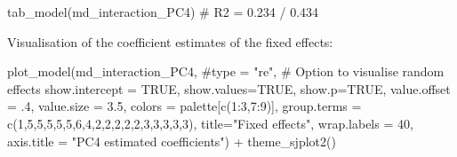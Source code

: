\documentclass[
  letterpaper,
  DIV=11,
  numbers=noendperiod]{scrreprt}
\newenvironment{Shaded}{\begin{snugshade}}{\end{snugshade}}
\newcommand{\AttributeTok}[1]{\textcolor[rgb]{0.40,0.45,0.13}{#1}}
\newcommand{\CommentTok}[1]{\textcolor[rgb]{0.37,0.37,0.37}{#1}}
\newcommand{\ConstantTok}[1]{\textcolor[rgb]{0.56,0.35,0.01}{#1}}
\newcommand{\DecValTok}[1]{\textcolor[rgb]{0.68,0.00,0.00}{#1}}
\newcommand{\FloatTok}[1]{\textcolor[rgb]{0.68,0.00,0.00}{#1}}
\newcommand{\FunctionTok}[1]{\textcolor[rgb]{0.28,0.35,0.67}{#1}}
\newcommand{\NormalTok}[1]{\textcolor[rgb]{0.00,0.23,0.31}{#1}}
\newcommand{\SpecialCharTok}[1]{\textcolor[rgb]{0.37,0.37,0.37}{#1}}
\newcommand{\StringTok}[1]{\textcolor[rgb]{0.13,0.47,0.30}{#1}}
\begin{document}
\begin{Shaded}
\begin{Highlighting}[]
\FunctionTok{tab\_model}\NormalTok{(md\_interaction\_PC4) }\CommentTok{\# R2 = 0.234 / 0.434}
\end{Highlighting}
\end{Shaded}

Visualisation of the coefficient estimates of the fixed effects:

\begin{Shaded}
\begin{Highlighting}[]
\FunctionTok{plot\_model}\NormalTok{(md\_interaction\_PC4, }
           \CommentTok{\#type = "re", \# Option to visualise random effects }
           \AttributeTok{show.intercept =} \ConstantTok{TRUE}\NormalTok{,}
           \AttributeTok{show.values=}\ConstantTok{TRUE}\NormalTok{, }
           \AttributeTok{show.p=}\ConstantTok{TRUE}\NormalTok{,}
           \AttributeTok{value.offset =}\NormalTok{ .}\DecValTok{4}\NormalTok{,}
           \AttributeTok{value.size =} \FloatTok{3.5}\NormalTok{,}
           \AttributeTok{colors =}\NormalTok{ palette[}\FunctionTok{c}\NormalTok{(}\DecValTok{1}\SpecialCharTok{:}\DecValTok{3}\NormalTok{,}\DecValTok{7}\SpecialCharTok{:}\DecValTok{9}\NormalTok{)],}
           \AttributeTok{group.terms =} \FunctionTok{c}\NormalTok{(}\DecValTok{1}\NormalTok{,}\DecValTok{5}\NormalTok{,}\DecValTok{5}\NormalTok{,}\DecValTok{5}\NormalTok{,}\DecValTok{5}\NormalTok{,}\DecValTok{5}\NormalTok{,}\DecValTok{6}\NormalTok{,}\DecValTok{4}\NormalTok{,}\DecValTok{2}\NormalTok{,}\DecValTok{2}\NormalTok{,}\DecValTok{2}\NormalTok{,}\DecValTok{2}\NormalTok{,}\DecValTok{2}\NormalTok{,}\DecValTok{3}\NormalTok{,}\DecValTok{3}\NormalTok{,}\DecValTok{3}\NormalTok{,}\DecValTok{3}\NormalTok{,}\DecValTok{3}\NormalTok{), }
           \AttributeTok{title=}\StringTok{"Fixed effects"}\NormalTok{,}
           \AttributeTok{wrap.labels =} \DecValTok{40}\NormalTok{,}
           \AttributeTok{axis.title =} \StringTok{"PC4 estimated coefficients"}\NormalTok{) }\SpecialCharTok{+}
  \FunctionTok{theme\_sjplot2}\NormalTok{() }
\end{Highlighting}
\end{Shaded}
\end{document}
